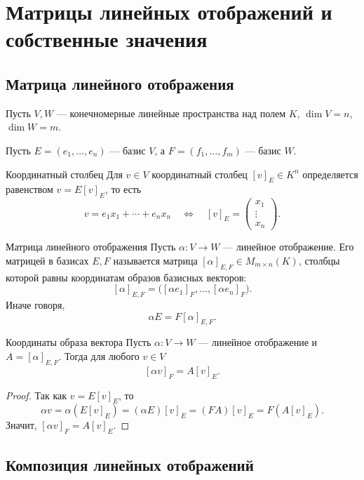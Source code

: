 
\section{Матрицы линейных отображений и собственные значения}

\subsection{Матрица линейного отображения}

Пусть $V,W$ --- конечномерные линейные пространства над полем $K$,
$\dim V=n$, $\dim W=m$.

Пусть $E=(e_1,\ldots,e_n)$ --- базис $V$, а $F=(f_1,\ldots,f_m)$ --- базис $W$.

\begin{Definition}{Координатный столбец}{}
	Для $v\in V$ координатный столбец $[v]_E\in K^n$ определяется равенством
	$v=E[v]_E$, то есть
	\[
	v=e_1x_1+\cdots+e_nx_n
	\quad \Longleftrightarrow \quad
	[v]_E=
	\begin{pmatrix}
		x_1\\
		\vdots\\
		x_n
	\end{pmatrix}.
	\]
\end{Definition}

\begin{Definition}{Матрица линейного отображения}{}
	Пусть $\alpha\colon V\to W$ --- линейное отображение. Его матрицей в базисах $E,F$ называется матрица $[\alpha]_{E,F}\in M_{m\times n}(K)$, столбцы которой равны координатам образов базисных векторов:
	\[
	[\alpha]_{E,F}
	=
	\bigl(
	[\alpha e_1]_F,\ldots,[\alpha e_n]_F
	\bigr).
	\]
	Иначе говоря,
	\[
	\alpha E=F[\alpha]_{E,F}.
	\]
\end{Definition}

\begin{Statement}{Координаты образа вектора}{}
	Пусть $\alpha\colon V\to W$ --- линейное отображение и $A=[\alpha]_{E,F}$. Тогда для любого $v\in V$
	\[
	[\alpha v]_F=A[v]_E.
	\]
\end{Statement}

\begin{proof}
	Так как $v=E[v]_E$, то
	\[
	\alpha v=\alpha(E[v]_E)=(\alpha E)[v]_E
	=(FA)[v]_E=F(A[v]_E).
	\]
	Значит, $[\alpha v]_F=A[v]_E$.
\end{proof}

\subsection{Композиция линейных отображений}

